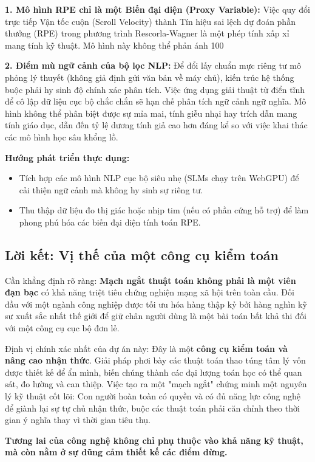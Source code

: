 \textbf{1. Mô hình RPE chỉ là một Biến đại diện (Proxy Variable):}
Việc quy đổi trực tiếp Vận tốc cuộn (Scroll Velocity) thành Tín hiệu sai lệch dự đoán phần thưởng (RPE) trong phương trình Rescorla-Wagner là một phép tính xấp xỉ mang tính kỹ thuật. Mô hình này không thể phản ánh 100%

\textbf{2. Điểm mù ngữ cảnh của bộ lọc NLP:}
Để đổi lấy chuẩn mực riêng tư mô phỏng lý thuyết (không giả định gửi văn bản về máy chủ), kiến trúc hệ thống buộc phải hy sinh độ chính xác phân tích. Việc ứng dụng giải thuật từ điển tĩnh để cô lập dữ liệu cục bộ chắc chắn sẽ hạn chế phân tích ngữ cảnh ngữ nghĩa. Mô hình không thể phân biệt được sự mỉa mai, tính giễu nhại hay trích dẫn mang tính giáo dục, dẫn đến tỷ lệ dương tính giả cao hơn đáng kể so với việc khai thác các mô hình học sâu khổng lồ.

\textbf{Hướng phát triển thực dụng:}
\begin{itemize}
    \item Tích hợp các mô hình NLP cục bộ siêu nhẹ (SLMs chạy trên WebGPU) để cải thiện ngữ cảnh mà không hy sinh sự riêng tư.
    \item Thu thập dữ liệu đo thị giác hoặc nhịp tim (nếu có phần cứng hỗ trợ) để làm phong phú hóa các biến đại diện tính toán RPE.
\end{itemize}

\subsection{Lời kết: Vị thế của một công cụ kiểm toán}

Cần khẳng định rõ ràng: \textbf{Mạch ngắt thuật toán không phải là một viên đạn bạc} có khả năng triệt tiêu chứng nghiện mạng xã hội trên toàn cầu. Đối đầu với một ngành công nghiệp được tối ưu hóa hàng thập kỷ bởi hàng nghìn kỹ sư xuất sắc nhất thế giới để giữ chân người dùng là một bài toán bất khả thi đối với một công cụ cục bộ đơn lẻ.

Định vị chính xác nhất của dự án này: Đây là một \textbf{công cụ kiểm toán và nâng cao nhận thức}. Giải pháp phơi bày các thuật toán thao túng tâm lý vốn được thiết kế để ẩn mình, biến chúng thành các đại lượng toán học có thể quan sát, đo lường và can thiệp. Việc tạo ra một "mạch ngắt" chứng minh một nguyên lý kỹ thuật cốt lõi: Con người hoàn toàn có quyền và có đủ năng lực công nghệ để giành lại sự tự chủ nhận thức, buộc các thuật toán phải căn chỉnh theo thời gian ý nghĩa thay vì thời gian tiêu thụ.

\textbf{Tương lai của công nghệ không chỉ phụ thuộc vào khả năng kỹ thuật, mà còn nằm ở sự dũng cảm thiết kế các điểm dừng.}

\newpage
